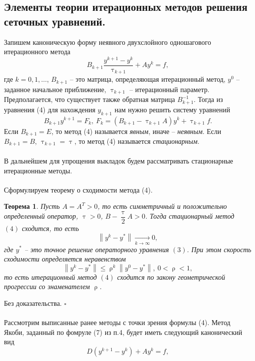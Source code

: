 \documentclass[a4paper, 12pt]{report}
\numberwithin{equation}{section}
\newenvironment{Proof} %
{\par\noindent{$\blacklozenge$}} %
{\hfill$\scriptstyle\square$}
\renewcommand{\leq}{\leqslant}
\renewcommand{\tau}{\uptau}
\renewcommand{\rho}{\uprho}
\newcommand\Norm[1]{\left\| #1 \right\|}
\newtheorem*{theorem}{Теорема}
\begin{document}
	\subsection{Элементы теории итерационных методов решения сеточных уравнений.}
	Запишем каноническую форму неявного двухслойного одношагового итерационного метода
	\begin{equation}
		B_{k+1} \dfrac{y^{k+1} - y^k}{\tau_{k+1}} + Ay^{k} = f,
	\end{equation}
	где $k=0,1,\ldots$, $B_{k+1}$ -- это матрица, определяющая итерационный метод, $y^0$ -- заданное начальное приближение, $\tau_{k+1}$ -- итерационный параметр. Предполагается, что существует также обратная матрица $B^{-1}_{k+1}$. Тогда из уравнения (4) для нахождения $y_{k+1}$ нам нужно решить систему уравнений 
	\begin{equation}
		B_{k+1}y^{k+1} = F_k,\ F_k = (B_{k+1} - \tau_{k+1}A)y^k + \tau_{k+1}f.
	\end{equation}
	Если $B_{k+1} = E$, то метод (4) называется \textit{явным}, иначе -- \textit{неявным}. Если $B_{k+1} = B$, $\tau_{k+1} = \tau$, то метод (4) называется \textit{стационарным}.\\\\
	В дальнейшем для упрощения выкладок будем рассматривать стационарные итерационные методы.\\\\
	Сформулируем теорему о сходимости метода (4).
	\begin{theorem}
		Пусть $A = A^T > 0$, то есть симметричный и положительно определенный оператор, $\tau > 0$, $B - \dfrac \tau 2 A > 0$. Тогда стационарный метод $(4)$ сходится, то есть
		$$\Norm{y^k - y^*} \xrightarrow[k\to \infty]{} 0,$$
		где $y^*$ -- это точное решение операторного уравнения $(3)$. При этом скорость сходимости определяется неравенством $$\Norm{y^k - y^*}\leq \rho ^k \Norm{y^0 - y^*},\ 0 < \rho < 1,$$
		то есть итерационный метод $(4)$ сходится по закону геометрической прогрессии со знаменателем $\rho$.
	\end{theorem}
	\begin{Proof}
		Без доказательства.
	\end{Proof}\\\\
	Рассмотрим выписанные ранее методы с точки зрения формулы (4). Метод Якоби, заданный по фомруле (7) из п.4, будет иметь следующий канонический вид
	\begin{equation}
		D(y^{k+1} - y^k) + Ay^k = f,
	\end{equation}
\end{document}
